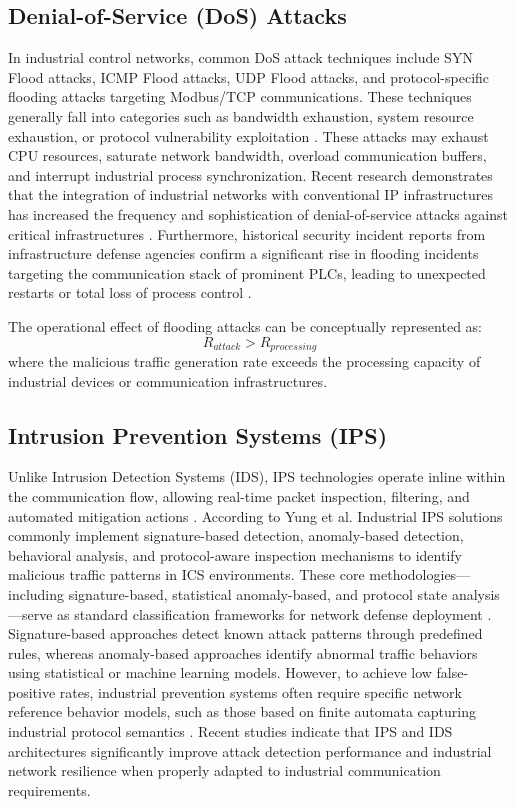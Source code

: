 \documentclass[sigconf]{acmart}
\begin{document}
\subsection{Denial-of-Service (DoS) Attacks}
In industrial control networks, common DoS attack techniques include SYN Flood attacks, ICMP Flood attacks, UDP Flood attacks, and protocol-specific flooding attacks targeting Modbus/TCP communications. These techniques generally fall into categories such as bandwidth exhaustion, system resource exhaustion, or protocol vulnerability exploitation \cite{Specht2004DDoS}. These attacks may exhaust CPU resources, saturate network bandwidth, overload communication buffers, and interrupt industrial process synchronization. Recent research demonstrates that the integration of industrial networks with conventional IP infrastructures has increased the frequency and sophistication of denial-of-service attacks against critical infrastructures \cite{Nicholson2021ICSAttacks}. Furthermore, historical security incident reports from infrastructure defense agencies confirm a significant rise in flooding incidents targeting the communication stack of prominent PLCs, leading to unexpected restarts or total loss of process control \cite{Chabrow2016ICS}.

The operational effect of flooding attacks can be conceptually represented as:
\[
R_{attack} > R_{processing}
\]
where the malicious traffic generation rate exceeds the processing capacity of industrial devices or communication infrastructures.

\subsection{Intrusion Prevention Systems (IPS)}
Unlike Intrusion Detection Systems (IDS), IPS technologies operate inline within the communication flow, allowing real-time packet inspection, filtering, and automated mitigation actions \cite{Raman2021ML}. According to Yung et al. \cite{Yu2019IDS} Industrial IPS solutions commonly implement signature-based detection, anomaly-based detection, behavioral analysis, and protocol-aware inspection mechanisms to identify malicious traffic patterns in ICS environments. These core methodologies—including signature-based, statistical anomaly-based, and protocol state analysis—serve as standard classification frameworks for network defense deployment \cite{Scarfone2007IDS}. Signature-based approaches detect known attack patterns through predefined rules, whereas anomaly-based approaches identify abnormal traffic behaviors using statistical or machine learning models. However, to achieve low false-positive rates, industrial prevention systems often require specific network reference behavior models, such as those based on finite automata capturing industrial protocol semantics \cite{Liao2013IDS}. Recent studies indicate that IPS and IDS architectures significantly improve attack detection performance and industrial network resilience when properly adapted to industrial communication requirements.
\end{document}
